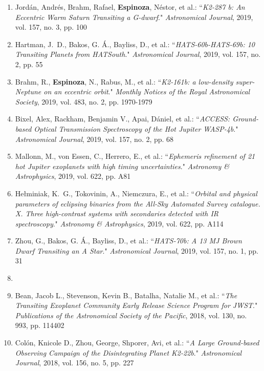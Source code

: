 \documentclass[12pt, a4paper]{article} %
\begin{document}
\begin{flushleft}
\begin{enumerate}
\item Jordán, Andrés, Brahm, Rafael, \textbf{Espinoza}, Néstor, et al.: ``\textit{K2-287 b: An Eccentric Warm Saturn Transiting a G-dwarf}." \textit{Astronomical Journal}, 2019, vol. 157, no. 3, pp. 100
\item Hartman, J.~D., Bakos, G. Á., Bayliss, D., et al.: ``\textit{HATS-60b-HATS-69b: 10 Transiting Planets from HATSouth}." \textit{Astronomical Journal}, 2019, vol. 157, no. 2, pp. 55
\item Brahm, R., \textbf{Espinoza}, N., Rabus, M., et al.: ``\textit{K2-161b: a low-density super-Neptune on an eccentric orbit}." \textit{Monthly Notices of the Royal Astronomical Society}, 2019, vol. 483, no. 2, pp. 1970-1979
\item Bixel, Alex, Rackham, Benjamin V., Apai, Dániel, et al.: ``\textit{ACCESS: Ground-based Optical Transmission Spectroscopy of the Hot Jupiter WASP-4b}." \textit{Astronomical Journal}, 2019, vol. 157, no. 2, pp. 68
\item Mallonn, M., von Essen, C., Herrero, E., et al.: ``\textit{Ephemeris refinement of 21 hot Jupiter exoplanets with high timing uncertainties}." \textit{Astronomy \& Astrophysics}, 2019, vol. 622, pp. A81
\item Hełminiak, K.~G., Tokovinin, A., Niemczura, E., et al.: ``\textit{Orbital and physical parameters of eclipsing binaries from the All-Sky Automated Survey catalogue. X. Three high-contrast systems with secondaries detected with IR spectroscopy}." \textit{Astronomy \& Astrophysics}, 2019, vol. 622, pp. A114
\item Zhou, G., Bakos, G. Á., Bayliss, D., et al.: ``\textit{HATS-70b: A 13 MJ Brown Dwarf Transiting an A Star}." \textit{Astronomical Journal}, 2019, vol. 157, no. 1, pp. 31
\item  {}
\item Bean, Jacob L., Stevenson, Kevin B., Batalha, Natalie M., et al.: ``\textit{The Transiting Exoplanet Community Early Release Science Program for JWST}." \textit{Publications of the Astronomical Society of the Pacific}, 2018, vol. 130, no. 993, pp. 114402
\item Colón, Knicole D., Zhou, George, Shporer, Avi, et al.: ``\textit{A Large Ground-based Observing Campaign of the Disintegrating Planet K2-22b}." \textit{Astronomical Journal}, 2018, vol. 156, no. 5, pp. 227

\end{enumerate}
\end{flushleft}
\end{document}
